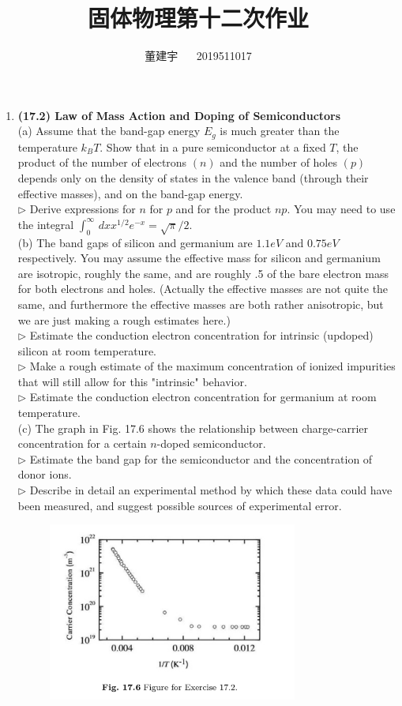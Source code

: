 \documentclass[reqno,a4paper,12pt]{amsart}
\title{固体物理第十二次作业}
\author{董建宇 ~~ 2019511017}
\begin{document}
\maketitle

\begin{enumerate}[1.]

\item \textbf{(17.2) Law of Mass Action and Doping of Semiconductors} \\
(a) Assume that the band-gap energy $E_g$ is much greater than the temperature $k_BT$. Show that in a pure semiconductor at a fixed $T$, the product of the number of electrons $(n)$ and the number of holes $(p)$ depends only on the density of states in the valence band (through their effective masses), and on the band-gap energy. \\
$\triangleright$ Derive expressions for $n$ for $p$ and for the product $np$. You may need to use the integral $\int_0^\infty \,dx x^{1/2}e^{-x} = \sqrt{\pi}/2$. \\
(b) The band gaps of silicon and germanium are $1.1eV$ and $0.75eV$ respectively. You may assume the effective mass for silicon and germanium are isotropic, roughly the same, and are roughly .5 of the bare electron mass for both electrons and holes. (Actually the effective masses are not quite the same, and furthermore the effective masses are both rather anisotropic, but we are just making a rough estimates here.) \\
$\triangleright$ Estimate the conduction electron concentration for intrinsic (updoped) silicon at room temperature. \\
$\triangleright$ Make a rough estimate of the maximum concentration of ionized impurities that will still allow for this "intrinsic" behavior. \\
$\triangleright$ Estimate the conduction electron concentration for germanium at room temperature. \\
(c) The graph in Fig. 17.6 shows the relationship between charge-carrier concentration for a certain $n$-doped semiconductor. \\
$\triangleright$ Estimate the band gap for the semiconductor and the concentration of donor ions. \\
$\triangleright$ Describe in detail an experimental method by which these data could have been measured, and suggest possible sources of experimental error. 
\begin{figure}[h]
	\centering
	\includegraphics[width = 82mm]{17.2.jpeg}

\end{figure}
\end{enumerate}
\end{document}
